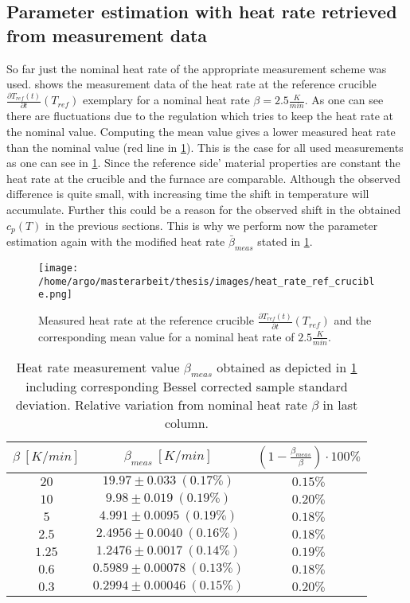 \documentclass{scrartcl}[12pt, halfparskip]
\numberwithin{equation}{section}
\numberwithin{figure}{section}
\numberwithin{table}{section}
\begin{document}
\subsection{Parameter estimation with heat rate retrieved from measurement data}
\label{sec:param_estimation_mod_heat_rate_FS}
So far just the nominal heat rate of the appropriate measurement scheme was used. 
 shows the measurement data of the heat rate at the reference crucible $\frac{\partial T_{ref}(t)}{\partial t}(T_{ref})$ exemplary for a nominal heat rate $\beta = 2.5 \frac{K}{min}$. 
As one can see there are fluctuations due to the regulation which tries to keep the heat rate at the nominal value. 
Computing the mean value gives a lower measured heat rate than the nominal value (red line in \cref{fig:heat_rate_measurement}). 
This is the case for all used measurements as one can see in \cref{tab:mod_heat_rate}. 
Since the reference side' material properties are constant the heat rate at the crucible and the furnace are comparable.
Although the observed difference is quite small, with increasing time the shift in temperature will accumulate.
Further this could be a reason for the observed shift in the obtained $c_p(T)$ in the previous sections.
This is why we perform now the parameter estimation again with the modified heat rate $\bar{\beta}_{meas}$ stated in \cref{tab:mod_heat_rate}.


\begin{figure}[H]
	\centering
	\texttt{[image: /home/argo/masterarbeit/thesis/images/heat\_rate\_ref\_crucible.png]}
	\caption{Measured heat rate at the reference crucible $\frac{\partial T_{ref}(t)}{\partial t}(T_{ref})$ and the corresponding mean value for a nominal heat rate of $2.5 \frac{K}{min}$.}
	\label{fig:heat_rate_measurement}
\end{figure}

\begin{table}[H]
	\centering
	\begin{tabular}{| c | c | c |} \hline 
		$\beta \ [K/min]$ & $\beta_{meas} \ [K/min]$ & $\left(1 - \frac{\beta_{meas}}{\beta}\right) \cdot 100\%$  \\ \hline
		$20$ & $19.97 \pm 0.033 \ (0.17\%)$ & $0.15\%$ \\
		$10$ & $9.98 \pm 0.019 \ (0.19\%)$ & $0.20\%$ \\
		$5$ & $4.991 \pm 0.0095 \ (0.19\%)$ & $0.18\%$ \\
		$2.5$ & $2.4956 \pm 0.0040 \ (0.16\%)$ & $0.18\%$ \\
		$1.25$ & $1.2476 \pm 0.0017 \ (0.14\%)$ & $0.19\%$ \\
		$0.6$ & $0.5989 \pm 0.00078 \ (0.13\%)$ & $0.18\%$ \\
		$0.3$ & $0.2994 \pm 0.00046 \ (0.15\%)$ & $0.20\%$ \\ \hline
	\end{tabular}
	\caption{Heat rate measurement value $\beta_{meas}$ obtained as depicted in \cref{fig:heat_rate_measurement} including corresponding Bessel corrected sample standard deviation. Relative variation from nominal heat rate $\beta$ in last column.}
	\label{tab:mod_heat_rate}
\end{table}
\end{document}
